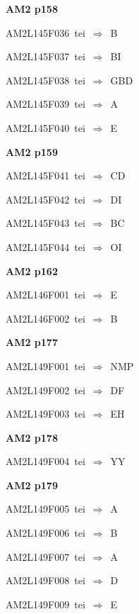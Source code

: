 \par\vfill\eject
{\bf\hfill AM2 p158\hfill\hbox{}}\par\bigskip
{\sixrm AM2L145F036\ {\sixit tei}\ }$\Rightarrow$\ B\par\smallskip
{\sixrm AM2L145F037\ {\sixit tei}\ }$\Rightarrow$\ BI\par\smallskip
{\sixrm AM2L145F038\ {\sixit tei}\ }$\Rightarrow$\ GBD\par\smallskip
{\sixrm AM2L145F039\ {\sixit tei}\ }$\Rightarrow$\ {\tenit A}\par\smallskip
{\sixrm AM2L145F040\ {\sixit tei}\ }$\Rightarrow$\ {\tenit E}\par\smallskip

\par\vfill\eject
{\bf\hfill AM2 p159\hfill\hbox{}}\par\bigskip
{\sixrm AM2L145F041\ {\sixit tei}\ }$\Rightarrow$\ CD\par\smallskip
{\sixrm AM2L145F042\ {\sixit tei}\ }$\Rightarrow$\ DI\par\smallskip
{\sixrm AM2L145F043\ {\sixit tei}\ }$\Rightarrow$\ BC\par\smallskip
{\sixrm AM2L145F044\ {\sixit tei}\ }$\Rightarrow$\ OI\par\smallskip

\par\vfill\eject
{\bf\hfill AM2 p162\hfill\hbox{}}\par\bigskip
{\sixrm AM2L146F001\ {\sixit tei}\ }$\Rightarrow$\ {\tenit E}\par\smallskip
{\sixrm AM2L146F002\ {\sixit tei}\ }$\Rightarrow$\ {\tenit B}\par\smallskip

\par\vfill\eject
{\bf\hfill AM2 p177\hfill\hbox{}}\par\bigskip
{\sixrm AM2L149F001\ {\sixit tei}\ }$\Rightarrow$\ NMP\par\smallskip
{\sixrm AM2L149F002\ {\sixit tei}\ }$\Rightarrow$\ DF\par\smallskip
{\sixrm AM2L149F003\ {\sixit tei}\ }$\Rightarrow$\ EH\par\smallskip

\par\vfill\eject
{\bf\hfill AM2 p178\hfill\hbox{}}\par\bigskip
{\sixrm AM2L149F004\ {\sixit tei}\ }$\Rightarrow$\ YY\par\smallskip

\par\vfill\eject
{\bf\hfill AM2 p179\hfill\hbox{}}\par\bigskip
{\sixrm AM2L149F005\ {\sixit tei}\ }$\Rightarrow$\ A\par\smallskip
{\sixrm AM2L149F006\ {\sixit tei}\ }$\Rightarrow$\ B\par\smallskip
{\sixrm AM2L149F007\ {\sixit tei}\ }$\Rightarrow$\ A\par\smallskip
{\sixrm AM2L149F008\ {\sixit tei}\ }$\Rightarrow$\ D\par\smallskip
{\sixrm AM2L149F009\ {\sixit tei}\ }$\Rightarrow$\ E\par\smallskip

